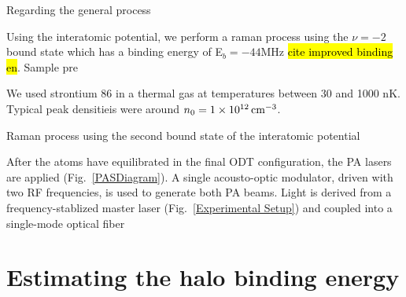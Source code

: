 Regarding the general process 

Using the \intPot{\gs}{\ex} interatomic potential, we perform a raman process using the $\nu=-2$ bound state which has a binding energy of E$_b=-44 \text{MHz}$ \hl{cite improved binding en}. Sample pre 

We used strontium 86 in a thermal gas at temperatures between 30 and 1000 nK. Typical peak densitieis were around $n_0 = 1 \times 10^{12} \, \text{cm}^{-3}$. 

Raman process using the second bound state of the \intPot{\gs}{\ex} interatomic potential

After the atoms have equilibrated in the final ODT configuration, the PA lasers are applied (Fig.\ \ref{PASDiagram}). A single acousto-optic modulator, driven with two RF frequencies, is used to generate both PA beams. Light is derived from a frequency-stablized master laser (Fig.\ \ref{Experimental Setup}) and coupled into a single-mode optical fiber 




\section{Estimating the halo binding energy} \label{sec:highE_theory}

